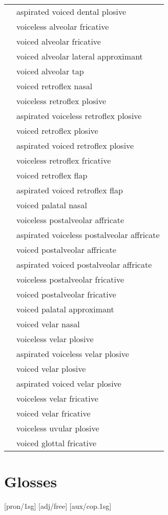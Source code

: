 \documentclass[12pt]{article}
\begin{document}
\begin{xltabular}{\textwidth}{lL}
   & aspirated voiced dental plosive \\
   & voiceless alveolar fricative \\
   & voiced alveolar fricative \\
   & voiced alveolar lateral approximant \\
   & voiced alveolar tap \\
   & voiced retroflex nasal \\
   & voiceless retroflex plosive \\
   & aspirated voiceless retroflex plosive \\
   & voiced retroflex plosive \\
   & aspirated voiced retroflex plosive \\
   & voiceless retroflex fricative \\
   & voiced retroflex flap \\
   & aspirated voiced retroflex flap \\
  \ipa{\textltailn} & voiced palatal nasal \\
  \ipa{\t{\textteshlig}} & voiceless postalveolar affricate \\
   & aspirated voiceless postalveolar affricate \\
  \ipa{\t{\textdyoghlig}} & voiced postalveolar affricate \\
   & aspirated voiced postalveolar affricate \\
   & voiceless postalveolar fricative \\
   & voiced postalveolar fricative \\
   & voiced palatal approximant \\
   & voiced velar nasal \\
   & voiceless velar plosive \\
   & aspirated voiceless velar plosive \\
   & voiced velar plosive \\
   & aspirated voiced velar plosive \\
   & voiceless velar fricative \\
   & voiced velar fricative \\
   & voiceless uvular plosive \\
   & voiced glottal fricative \\
\end{xltabular}

\newpage\section{Glosses}

\ex[lingstyle=custom_nlevel]
\begingl
{}[pron/{\sc 1sg}]
[adj/free]
[aux/{\sc cop.1sg}]
\endgl
\xe
\end{document}
